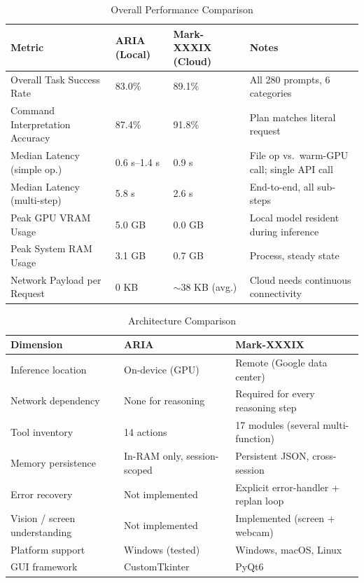 \documentclass[conference]{IEEEtran}
\begin{document}
\begin{table}[htbp]
\caption{Overall Performance Comparison}
\label{tab:overall}
\centering
\small
\begin{tabular}{p{2.25cm}p{1.15cm}p{1.25cm}p{2.15cm}}
\toprule
\textbf{Metric} & \textbf{ARIA (Local)} & \textbf{Mark-XXXIX (Cloud)} & \textbf{Notes} \\
\midrule
Overall Task Success Rate & 83.0\% & 89.1\% & All 280 prompts, 6 categories \\
Command Interpretation Accuracy & 87.4\% & 91.8\% & Plan matches literal request \\
Median Latency (simple op.) & 0.6 s--1.4 s & 0.9 s & File op vs.\ warm-GPU call; single API call \\
Median Latency (multi-step) & 5.8 s & 2.6 s & End-to-end, all sub-steps \\
Peak GPU VRAM Usage & 5.0 GB & 0.0 GB & Local model resident during inference \\
Peak System RAM Usage & 3.1 GB & 0.7 GB & Process, steady state \\
Network Payload per Request & 0 KB & $\sim$38 KB (avg.) & Cloud needs continuous connectivity \\
\bottomrule
\end{tabular}
\end{table}

\begin{table}[htbp]
\caption{Architecture Comparison}
\label{tab:archcomp}
\centering
\small
\begin{tabular}{p{1.7cm}p{2.5cm}p{2.8cm}}
\toprule
\textbf{Dimension} & \textbf{ARIA} & \textbf{Mark-XXXIX} \\
\midrule
Inference location & On-device (GPU) & Remote (Google data center) \\
Network dependency & None for reasoning & Required for every reasoning step \\
Tool inventory & 14 actions & 17 modules (several multi-function) \\
Memory persistence & In-RAM only, session-scoped & Persistent JSON, cross-session \\
Error recovery & Not implemented & Explicit error-handler + replan loop \\
Vision / screen understanding & Not implemented & Implemented (screen + webcam) \\
Platform support & Windows (tested) & Windows, macOS, Linux \\
GUI framework & CustomTkinter & PyQt6 \\
\bottomrule
\end{tabular}
\end{table}
\end{document}
